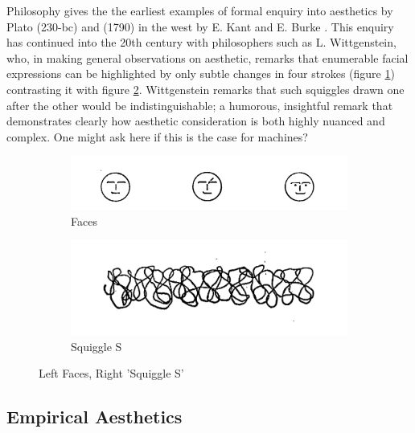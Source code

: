 Philosophy gives the the earliest examples of formal enquiry into aesthetics by Plato\cite{Plochmann1976} (230-bc) and (1790)  in the west by E. Kant and E. Burke \cite{Kant1892kant, Burke1773philosophical}. This enquiry has continued into the 20th century with philosophers such as L. Wittgenstein\cite{Wittgenstien1967}, who, in making general observations on aesthetic, remarks that enumerable facial expressions can be highlighted by only subtle changes in four strokes (figure \ref{fig:faces})  contrasting it with figure \ref{fig:squiggle}. Wittgenstein remarks that such squiggles drawn one after the other would be indistinguishable; a humorous, insightful remark that demonstrates clearly how aesthetic consideration is both highly nuanced and complex. One might ask here if this is the case for machines? 
\begin{figure}[H]
    \centering
    \begin{subfigure}[b]{0.3\textwidth}
    \centering
    \includegraphics[width=\textwidth]{figures/introduction/faces.png}
    \caption{Faces}
    \label{fig:faces}
    \end{subfigure}
    \begin{subfigure}[b]{0.3\textwidth}
    \centering
    \includegraphics[width=\textwidth]{figures/introduction/squiggle_s.png}
    \caption{Squiggle S}
    \label{fig:squiggle}
    \end{subfigure}
    \caption{Left Faces, Right 'Squiggle S' \cite{Wittgenstien1967} }
    \label{fig:Witgenstein}
\end{figure}


\subsection{Empirical Aesthetics}


